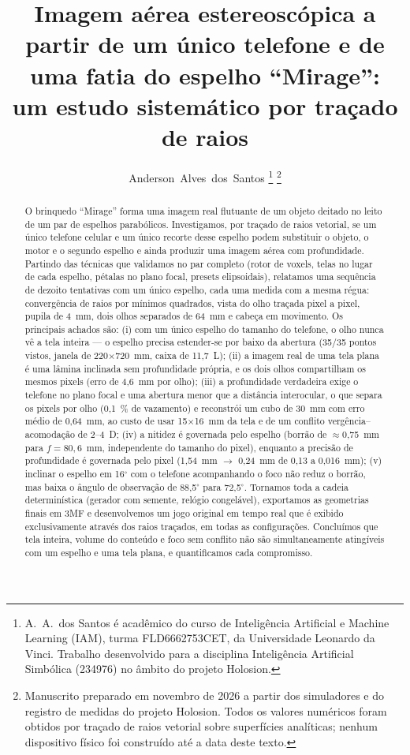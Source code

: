 \documentclass[journal,10pt]{IEEEtran}
\title{Imagem a\'erea estereosc\'opica a partir de um \'unico telefone e de uma fatia do espelho ``Mirage'':\\ um estudo sistem\'atico por tra\c{c}ado de raios}
\author{Anderson~Alves~dos~Santos%
\thanks{A.~A.~dos Santos \'e acad\^emico do curso de Intelig\^encia Artificial e Machine Learning (IAM), turma FLD6662753CET, da Universidade Leonardo da Vinci. Trabalho desenvolvido para a disciplina Intelig\^encia Artificial Simb\'olica (234976) no \^ambito do projeto Holosion.}%
\thanks{Manuscrito preparado em novembro de 2026 a partir dos simuladores e do registro de medidas do projeto Holosion. Todos os valores num\'ericos foram obtidos por tra\c{c}ado de raios vetorial sobre superf\'icies anal\'iticas; nenhum dispositivo f\'isico foi constru\'ido at\'e a data deste texto.}}
\begin{document}
\maketitle

\begin{abstract}
O brinquedo ``Mirage'' forma uma imagem real flutuante de um objeto deitado no leito de um par de espelhos parab\'olicos. Investigamos, por tra\c{c}ado de raios vetorial, se um \'unico telefone celular e um \'unico recorte desse espelho podem substituir o objeto, o motor e o segundo espelho e ainda produzir uma imagem a\'erea com profundidade. Partindo das t\'ecnicas que validamos no par completo (rotor de voxels, telas no lugar de cada espelho, p\'etalas no plano focal, presets elipsoidais), relatamos uma sequ\^encia de dezoito tentativas com um \'unico espelho, cada uma medida com a mesma r\'egua: converg\^encia de raios por m\'inimos quadrados, vista do olho tra\c{c}ada pixel a pixel, pupila de 4~mm, dois olhos separados de 64~mm e cabe\c{c}a em movimento. Os principais achados s\~ao: (i) com um \'unico espelho do tamanho do telefone, o olho nunca v\^e a tela inteira --- o espelho precisa estender-se por baixo da abertura (35/35 pontos vistos, janela de 220$\times$720~mm, caixa de 11,7~L); (ii) a imagem real de uma tela plana \'e uma l\^amina inclinada sem profundidade pr\'opria, e os dois olhos compartilham os mesmos pixels (erro de 4,6~mm por olho); (iii) a profundidade verdadeira exige o telefone no plano focal e uma abertura menor que a dist\^ancia interocular, o que separa os pixels por olho (0,1~\% de vazamento) e reconstr\'oi um cubo de 30~mm com erro m\'edio de 0,64~mm, ao custo de usar 15$\times$16~mm da tela e de um conflito verg\^encia--acomoda\c{c}\~ao de 2--4~D; (iv) a nitidez \'e governada pelo espelho (borr\~ao de $\approx$0,75~mm para $f=80{,}6$~mm, independente do tamanho do pixel), enquanto a precis\~ao de profundidade \'e governada pelo pixel (1,54~mm $\to$ 0,24~mm de 0,13 a 0,016~mm); (v) inclinar o espelho em 16$^\circ$ com o telefone acompanhando o foco n\~ao reduz o borr\~ao, mas baixa o \^angulo de observa\c{c}\~ao de 88,5$^\circ$ para 72,5$^\circ$. Tornamos toda a cadeia determin\'istica (gerador com semente, rel\'ogio congel\'avel), exportamos as geometrias finais em 3MF e desenvolvemos um jogo original em tempo real que \'e exibido exclusivamente atrav\'es dos raios tra\c{c}ados, em todas as configura\c{c}\~oes. Conclu\'imos que tela inteira, volume do conte\'udo e foco sem conflito n\~ao s\~ao simultaneamente ating\'iveis com um espelho e uma tela plana, e quantificamos cada compromisso.
\end{abstract}
\end{document}
